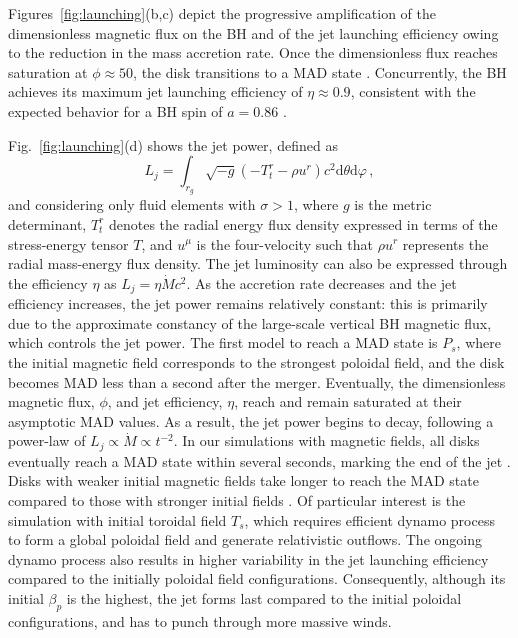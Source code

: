 \documentclass[twocolumn,dvipsnames]{aastex62}
\begin{document}
Figures~\ref{fig:launching}(b,c) depict the progressive amplification of the dimensionless magnetic flux on the BH and of the jet launching efficiency owing to the reduction in the mass accretion rate. Once the dimensionless flux reaches saturation at $ \phi \approx 50 $, the disk transitions to a MAD state \citep{Tchekhovskoy2011,2015ASSL..414...45T}. Concurrently, the BH achieves its maximum jet launching efficiency of $ \eta \approx 0.9 $, consistent with the expected behavior for a BH spin of $ a = 0.86 $ \citep{Lowell2023}.

Fig.~\ref{fig:launching}(d) shows the jet power, defined as
\begin{equation}
    L_j = \int_{r_g}\sqrt{-g}(-T^r_t-\rho u^r)c^2\mathrm{d}\theta \mathrm{d}\varphi\,,
\end{equation}
and considering only fluid elements with $ \sigma > 1 $, where $ g $ is the metric determinant, $ T^r_t $ denotes the radial energy flux density expressed in terms of the stress-energy tensor $ T $, and $ u^\mu $ is the four-velocity such that $ \rho u^r $ represents the radial mass-energy flux density. The jet luminosity can also be expressed through the efficiency $\eta$ as $ L_j = \eta\dot{M}c^2 $. As the accretion rate decreases and the jet efficiency increases, the jet power remains relatively constant: this is primarily due to the approximate constancy of the large-scale vertical BH magnetic flux, which controls the jet power. The first model to reach a MAD state is $ P_s $, where the initial magnetic field corresponds to the strongest poloidal field, and the disk becomes MAD less than a second after the merger. Eventually, the dimensionless magnetic flux, $\phi$, and jet efficiency, $ \eta $, reach and remain saturated at their asymptotic MAD values. As a result, the jet power begins to decay, following a power-law of $ L_j \propto \dot{M} \propto t^{-2} $. In our simulations with magnetic fields, all disks eventually reach a MAD state within several seconds, marking the end of the jet \citep[see][who explored a similar idea in the context of long GRBs]{Tchekhovskoy2015}. Disks with weaker initial magnetic fields take longer to reach the MAD state compared to those with stronger initial fields \citep[see also][]{Christie2019,Fernandez2019}. Of particular interest is the simulation with initial toroidal field $ T_s $, which requires efficient dynamo process to form a global poloidal field and generate relativistic outflows. The ongoing dynamo process also results in higher variability in the jet launching efficiency compared to the initially poloidal field configurations. Consequently, although its initial $ \beta_p $ is the highest, the jet forms last compared to the initial poloidal configurations, and has to punch through more massive winds.
\end{document}
